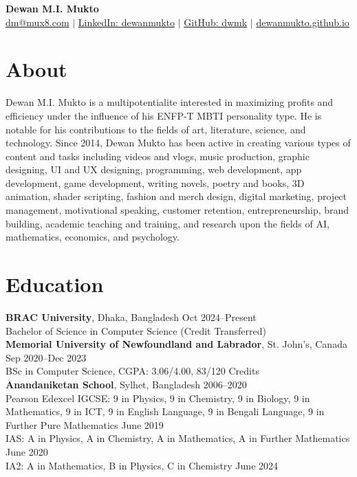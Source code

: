 \documentclass[10pt,letterpaper]{article}
\begin{document}
\begin{center}
    {\huge\bfseries Dewan M.I. Mukto} \\
    \vspace{2pt}
    \small
    \href{mailto:hiring@mux8.com}{dm@mux8.com} $|$
    \href{https://www.linkedin.com/in/dewanmukto}{LinkedIn: dewanmukto} $|$
    \href{https://github.com/dwmk}{GitHub: dwmk} $|$
    \href{https://dewanmukto.github.io/v2}{dewanmukto.github.io}
\end{center}

\section*{About}
Dewan M.I. Mukto is a multipotentialite interested in maximizing profits and efficiency under the influence of his ENFP-T MBTI personality type. He is notable for his contributions to the fields of art, literature, science, and technology. Since 2014, Dewan Mukto has been active in creating various types of content and tasks including videos and vlogs, music production, graphic designing, UI and UX designing, programming, web development, app development, game development, writing novels, poetry and books, 3D animation, shader scripting, fashion and merch design, digital marketing, project management, motivational speaking, customer retention, entrepreneurship, brand building, academic teaching and training, and research upon the fields of AI, mathematics, economics, and psychology.

\section*{Education}
\textbf{BRAC University}, Dhaka, Bangladesh \hfill Oct 2024--Present \\
\hspace*{1.5em} Bachelor of Science in Computer Science (Credit Transferred)\\
\textbf{Memorial University of Newfoundland and Labrador}, St. John's, Canada \hfill Sep 2020--Dec 2023 \\
\hspace*{1.5em} BSc in Computer Science, CGPA: 3.06/4.00, 83/120 Credits \\
\textbf{Anandaniketan School}, Sylhet, Bangladesh \hfill 2006--2020 \\
\hspace*{1.5em} Pearson Edexcel IGCSE: 9 in Physics, 9 in Chemistry, 9 in Biology, 9 in Mathematics, 9 in ICT, 9 in English Language, 9 in Bengali Language, 9 in Further Pure Mathematics \hfill June 2019\\
\hspace*{1.5em} IAS: A in Physics, A in Chemistry, A in Mathematics, A in Further Mathematics \hfill June 2020\\
\hspace*{1.5em} IA2: A in Mathematics, B in Physics, C in Chemistry \hfill June 2024
\end{document}
